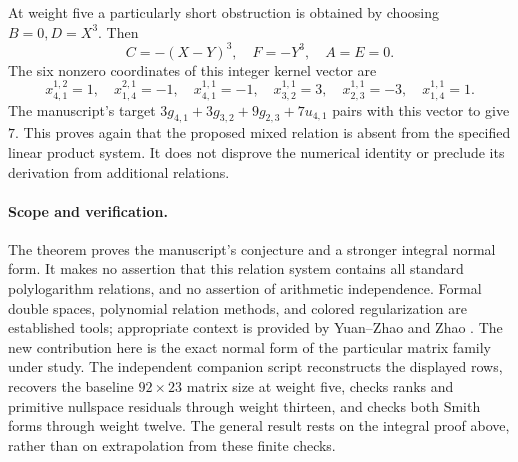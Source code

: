 At weight five a particularly short obstruction is obtained by choosing
$B=0,D=X^3$.  Then
\[
 C=-(X-Y)^3,\quad F=-Y^3,\quad A=E=0.
\]
The six nonzero coordinates of this integer kernel vector are
\[
 x_{4,1}^{1,2}=1,\quad x_{1,4}^{2,1}=-1,\quad
 x_{4,1}^{1,1}=-1,\quad x_{3,2}^{1,1}=3,\quad
 x_{2,3}^{1,1}=-3,\quad x_{1,4}^{1,1}=1.
\]
The manuscript's target
$3g_{4,1}+3g_{3,2}+9g_{2,3}+7u_{4,1}$ pairs with this vector to give
$7$.  This proves again that the proposed mixed relation is absent from
the specified linear product system.  It does not disprove the numerical
identity or preclude its derivation from additional relations.

\paragraph{Scope and verification.}
The theorem proves the manuscript's conjecture and a stronger integral
normal form.  It makes no assertion that this relation system contains
all standard polylogarithm relations, and no assertion of arithmetic
independence.  Formal double spaces, polynomial relation methods, and
colored regularization are established tools; appropriate context is
provided by Yuan--Zhao \cite{YuanZhao} and Zhao \cite{Zhao}.  The new contribution here
is the exact normal form of the particular matrix family under study.
The independent companion script reconstructs the displayed rows,
recovers the baseline $92\times23$ matrix size at weight five, checks
ranks and primitive nullspace residuals through weight thirteen, and
checks both Smith forms through weight twelve.  The general result rests
on the integral proof above, rather than on extrapolation from these
finite checks.
